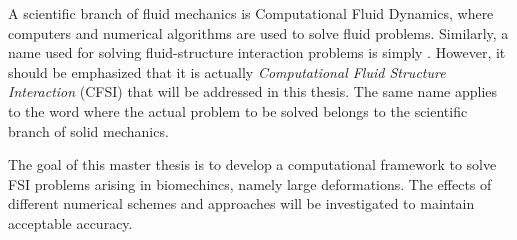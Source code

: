 A scientific branch of fluid mechanics is Computational Fluid Dynamics, where computers and numerical algorithms are used to solve fluid problems. Similarly, a name used for solving fluid-structure interaction problems is simply . However, it should be emphasized that it is actually \textit{Computational Fluid Structure Interaction} (CFSI) that will be addressed in this thesis. The same name applies to the word  where the actual problem to be solved belongs to the scientific branch of solid mechanics. \newline

The goal of this master thesis is to develop a computational framework to solve FSI problems arising in biomechincs, namely large deformations. The effects of different numerical schemes and approaches will be investigated to maintain acceptable accuracy.

